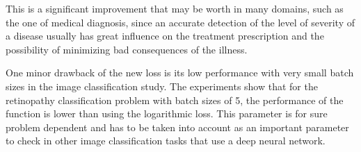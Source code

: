 This is a significant improvement that may be worth in many domains, such as the one of medical diagnosis, since an accurate detection of the level of severity of a disease usually has great influence on the treatment prescription and the possibility of minimizing bad consequences of the illness.

One minor drawback of the new loss is its low performance with very small batch sizes in the image classification study. The experiments show that for the retinopathy classification problem with batch sizes of 5, the performance of the function is lower than using the logarithmic loss. This parameter is for sure problem dependent and has to be taken into account as an important parameter to check in other image classification tasks that use a deep neural network.
